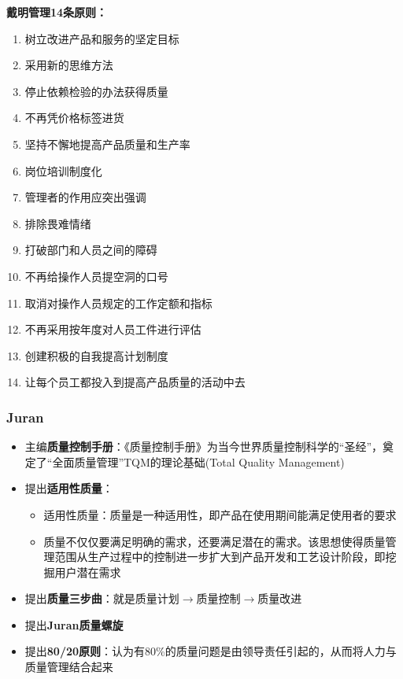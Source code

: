 \textbf{戴明管理14条原则：}
\vspace{-0.8em}
\begin{multicols}{2}
    \begin{enumerate}[label=\arabic*.]
        \item 树立改进产品和服务的坚定目标
        \item 采用新的思维方法
        \item 停止依赖检验的办法获得质量
        \item 不再凭价格标签进货
        \item 坚持不懈地提高产品质量和生产率
        \item 岗位培训制度化
        \item 管理者的作用应突出强调
        \item 排除畏难情绪
        \item 打破部门和人员之间的障碍
        \item 不再给操作人员提空洞的口号
        \item 取消对操作人员规定的工作定额和指标
        \item 不再采用按年度对人员工件进行评估
        \item 创建积极的自我提高计划制度
        \item 让每个员工都投入到提高产品质量的活动中去
    \end{enumerate}
\end{multicols}
\vspace{-1em}

\subsubsection{Juran}
\begin{itemize}
    \item 主编\textbf{质量控制手册}：《质量控制手册》为当今世界质量控制科学的“圣经”，奠定了“全面质量管理”TQM的理论基础(Total Quality Management)
    \item 提出\textbf{适用性质量}：
    \begin{itemize}
        \item 适用性质量：质量是一种适用性，即产品在使用期间能满足使用者的要求
        \item 质量不仅仅要满足明确的需求，还要满足潜在的需求。该思想使得质量管理范围从生产过程中的控制进一步扩大到产品开发和工艺设计阶段，即挖掘用户潜在需求
    \end{itemize}
    \item 提出\textbf{质量三步曲}：就是质量计划$\rightarrow$质量控制$\rightarrow$质量改进
    \item 提出\textbf{Juran质量螺旋}
    \item 提出\textbf{80/20原则}：认为有80\%的质量问题是由领导责任引起的，从而将人力与质量管理结合起来
\end{itemize}

